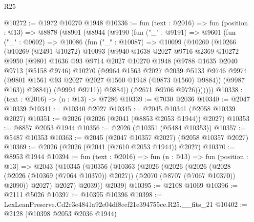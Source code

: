 \begin{lexlean}{R25}
\begin{coremodule}
@10272 := @1972 @10270 @1948
@10336 := fun (text : @2016) =>
  fun (position : @13) =>
  @8878
    (@8901
      (@8944
        (@9190
          (fun ("_" : @9191) =>
          @9601
            (fun ("_" : @9602) =>
            @10086
              (fun ("_" : @10087) =>
              @10099
                (@10260
                  (@10266
                    (@10269
                      (@2491 @10272)
                      @10093
                      (@9940
                        @1638
                        @2027
                        @9716
                        @2369
                        @10272
                        @9950
                        (@9801
                          @1636
                          @93
                          @9714
                          @2027
                          @10270
                          @1948
                          (@9788
                            @1635
                            @2040
                            @9713
                            (@5158 @9746)
                            @10270
                            (@9964
                              @1563
                              @2027
                              @2039
                              @5133
                              @9746
                              @9974
                              (@9801 @1561 @93 @2027 @2027 @1560 @1948 (@9873 @1560) @9884))
                            (@9987 @163))
                          @9884))
                      (@9994 @9711))
                    @9884))
                (@2671 @9706 @9726)))))))
@10338 := (text : @2016) -> (n : @13) -> @7286
@10339 := @7030 @2036
@10340 := @2047 @10339
@10341 := @10340 @2027
@10345 := @2045 @10341 (@2058 @10339 @2027)
@10351 := @2026 (@2026 (@2041 (@8853 @2053 @1944)) @2027)
@10353 := @8857 @2053 @1944
@10356 := @2026 (@10351 (@5484 @10353))
@10357 := @5487 @10353
@10363 := @2045 (@2047 @10357 @2027) (@2058 @10357 @2027)
@10369 := @2026 (@2026 (@2041 (@7610 @2053 @1944)) @2027)
@10370 := @8953 @1944
@10394 := fun (text : @2016) =>
  fun (n : @13) =>
  fun (position : @13) =>
  @2043
    (@10345
      (@10356
        (@10363
          (@2026
            (@2026
              (@2026
                (@2028 (@2026 (@10369 (@7064 @10370)) @2027))
                (@2070 (@8707 (@7067 @10370)) @2090))
              @2027)
            @2027)
          @2039))
      @2039)
@10395 := @2108 @1069
@10396 := @2111 @5026
@10397 := @10395 @10396
@10398 := LexLeanPreserve.Cd2c3e4841a92e04df8eef21e394755ce.R25.__fits_21
@10402 := @2128 (@10398 @2053 @2036 @1944)

\end{coremodule}
\end{lexlean}
